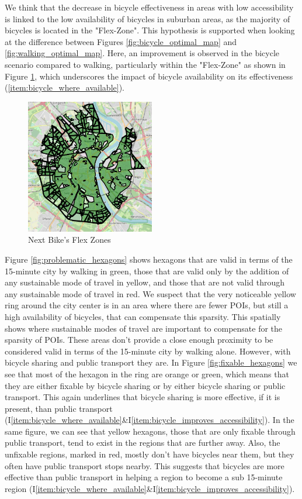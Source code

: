 We think that the decrease in bicycle effectiveness in areas with low accessibility is linked to the low availability of bicycles in suburban areas, as the majority of bicycles is located in the "Flex-Zone".
This hypothesis is supported when looking at the difference between Figures \ref{fig:bicycle_optimal_map} and \ref{fig:walking_optimal_map}. 
Here, an improvement is observed in the bicycle scenario compared to walking, particularly within the "Flex-Zone" as shown in Figure \ref{fig:flex_zones}, which underscores the impact of bicycle availability on its effectiveness (\ref{item:bicycle_where_available}).
\begin{figure}
  \begin{center}
    \includegraphics[width=0.50\textwidth]{Figures/discussion/flex_zones.png}
  \end{center}
  \caption{Next Bike's Flex Zones}
  \label{fig:flex_zones}
\end{figure}

Figure \ref{fig:problematic_hexagons} shows hexagons that are valid in terms of the 15-minute city by walking in green, those that are valid only by the addition of any sustainable mode of travel in yellow, and those that are not valid through any sustainable mode of travel in red.
We suspect that the very noticeable yellow ring around the city center is in an area where there are fewer POIs, but still a high availability of bicycles, that can compensate this sparsity.
This spatially shows where sustainable modes of travel are important to compensate for the sparsity of POIs.
These areas don't provide a close enough proximity to be considered valid in terms of the 15-minute city by walking alone.
However, with bicycle sharing and public transport they are.
In Figure \ref{fig:fixable_hexagons} we see that most of the hexagon in the ring are orange or green, which means that they are either fixable by bicycle sharing or by either bicycle sharing or public transport.
This again underlines that bicycle sharing is more effective, if it is present, than public transport (I\ref{item:bicycle_where_available}\&I\ref{item:bicycle_improves_accessibility}).
In the same figure, we can see that yellow hexagons, those that are only fixable through public transport, tend to exist in the regions that are further away.
Also, the unfixable regions, marked in red,  mostly don't have bicycles near them, but they often have public transport stops nearby.
This suggests that bicycles are more effective than public transport in helping a region to become a sub 15-minute region (I\ref{item:bicycle_where_available}\&I\ref{item:bicycle_improves_accessibility}).

